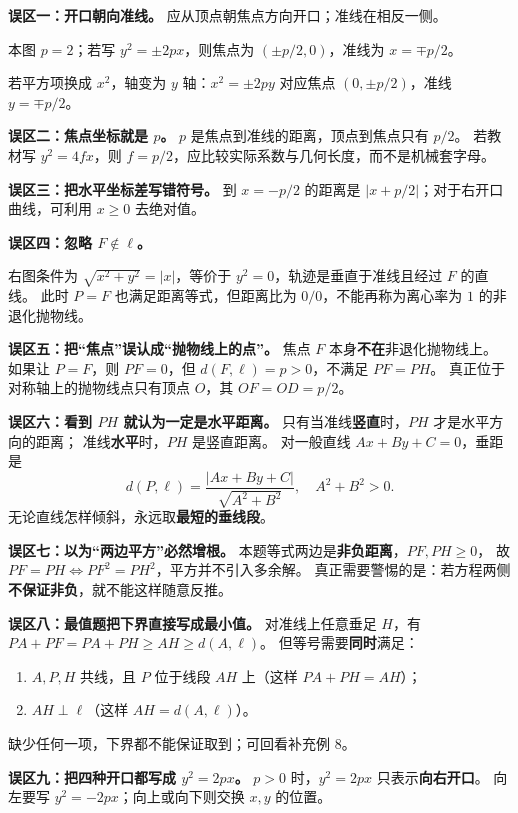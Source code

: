 \clearpage
\begin{trapbox}
\textbf{误区一：开口朝向准线。} 应从顶点朝焦点方向开口；准线在相反一侧。

本图 $p=2$；若写 $y^2=\pm2px$，则焦点为 $(\pm p/2,0)$，准线为 $x=\mp p/2$。
\end{trapbox}
\clearpage
\begin{trapbox}

若平方项换成 $x^2$，轴变为 $y$ 轴：$x^2=\pm2py$ 对应焦点 $(0,\pm p/2)$，准线 $y=\mp p/2$。

\textbf{误区二：焦点坐标就是 $p$。} $p$ 是焦点到准线的距离，顶点到焦点只有 $p/2$。
若教材写 $y^2=4fx$，则 $f=p/2$，应比较实际系数与几何长度，而不是机械套字母。

\textbf{误区三：把水平坐标差写错符号。}
到 $x=-p/2$ 的距离是 $|x+p/2|$；对于右开口曲线，可利用 $x\ge0$ 去绝对值。
\end{trapbox}
\clearpage
\begin{trapbox}
\textbf{误区四：忽略 $F\notin\ell$。}

右图条件为 $\sqrt{x^2+y^2}=|x|$，等价于 $y^2=0$，轨迹是垂直于准线且经过 $F$ 的直线。
此时 $P=F$ 也满足距离等式，但距离比为 $0/0$，不能再称为离心率为 $1$ 的非退化抛物线。
\end{trapbox}

\clearpage
\begin{trapbox}
\textbf{误区五：把“焦点”误认成“抛物线上的点”。}
焦点 $F$ 本身\textbf{不在}非退化抛物线上。
如果让 $P=F$，则 $PF=0$，但 $d(F,\ell)=p>0$，不满足 $PF=PH$。
真正位于对称轴上的抛物线点只有顶点 $O$，其 $OF=OD=p/2$。

\medskip
\textbf{误区六：看到 $PH$ 就认为一定是水平距离。}
只有当准线\textbf{竖直}时，$PH$ 才是水平方向的距离；
准线\textbf{水平}时，$PH$ 是竖直距离。
对一般直线 $Ax+By+C=0$，垂距是
\[
d(P,\ell)=\frac{|Ax+By+C|}{\sqrt{A^2+B^2}},\quad A^2+B^2>0.
\]
无论直线怎样倾斜，永远取\textbf{最短的垂线段}。

\medskip
\textbf{误区七：以为“两边平方”必然增根。}
本题等式两边是\textbf{非负距离}，$PF,PH\ge0$，
故 $PF=PH\iff PF^2=PH^2$，平方并不引入多余解。
真正需要警惕的是：若方程两侧\textbf{不保证非负}，就不能这样随意反推。
\end{trapbox}
\clearpage
\begin{trapbox}
\textbf{误区八：最值题把下界直接写成最小值。}
对准线上任意垂足 $H$，有 $PA+PF=PA+PH\ge AH\ge d(A,\ell)$。
但等号需要\textbf{同时}满足：
\begin{enumerate}[leftmargin=*]
\item $A,P,H$ 共线，且 $P$ 位于线段 $AH$ 上（这样 $PA+PH=AH$）；
\item $AH\perp\ell$（这样 $AH=d(A,\ell)$）。
\end{enumerate}
缺少任何一项，下界都不能保证取到；可回看补充例 8。

\medskip
\textbf{误区九：把四种开口都写成 $y^2=2px$。}
$p>0$ 时，$y^2=2px$ 只表示\textbf{向右开口}。
向左要写 $y^2=-2px$；向上或向下则交换 $x,y$ 的位置。
\end{trapbox}
